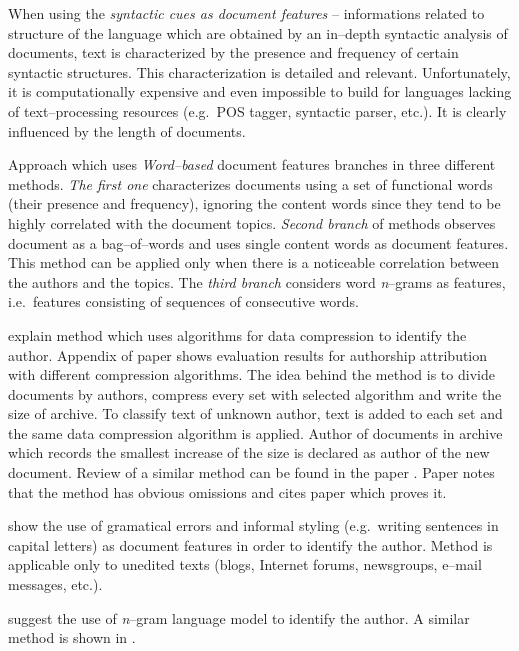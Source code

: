 \documentclass[11pt,english]{article}
\begin{document}
\begin{multicols}{2}
When using the \emph{syntactic cues as document features} -- informations
related to structure of the language which are obtained by an in--depth syntactic
analysis of documents, text is characterized by the presence and frequency of
certain syntactic structures. This characterization is detailed and relevant.
Unfortunately, it is computationally expensive and even impossible to build for
languages lacking of text--processing resources (e.g.\ POS tagger, syntactic
parser, etc.). It is clearly influenced by the length of documents.

Approach which uses \emph{Word--based} document features branches in three
different methods. \emph{The first one} characterizes documents using a set of
functional words (their presence and frequency), ignoring the content words since
they tend to be highly correlated with the document topics. \emph{Second branch}
of methods observes document as a bag--of--words and uses single content words as
document features. This method can be applied only when there is a noticeable
correlation between the authors and the topics. The \emph{third branch} considers
word \emph{n}--grams as features, i.e.\ features consisting of sequences of
consecutive words.

\citet{kukushkina2001using} explain method which uses algorithms for data
compression to identify the author. Appendix of paper shows evaluation results
for authorship attribution with different compression algorithms. The idea behind
the method is to divide documents by authors, compress every set with selected
algorithm and write the size of archive. To classify text of unknown author,
text is added to each set and the same data compression algorithm is applied. Author of
documents in archive which records the smallest increase of the size is declared
as author of the new document. Review of a similar method can be found in the
paper \citep{zhao2005effective}. Paper notes that the method has obvious
omissions and cites paper which proves it.

\citet{koppel2003exploiting} show the use of gramatical errors and informal
styling (e.g.\ writing sentences in capital letters) as document features in
order to identify the author. Method is applicable only to unedited texts (blogs,
Internet forums, newsgroups, e--mail messages, etc.).

\citet{peng2003language} suggest the use of \emph{n}--gram language model to identify
the author. A similar method is shown in \citep{coyotl2006authorship}.


\end{multicols}
\end{document}
